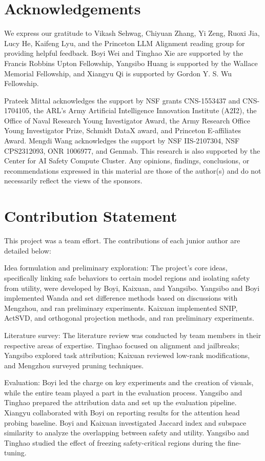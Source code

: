 \documentclass[10pt]{article}
\begin{document}
\section*{Acknowledgements}
We express our gratitude to Vikash Sehwag, Chiyuan Zhang, Yi Zeng, Ruoxi Jia, Lucy He, Kaifeng Lyu, and the Princeton LLM Alignment reading group for providing helpful feedback. Boyi Wei and Tinghao Xie are supported by the Francis Robbins Upton Fellowship, Yangsibo Huang is supported by the Wallace Memorial Fellowship, and Xiangyu Qi is supported by Gordon Y. S. Wu Fellowship.

Prateek Mittal acknowledges the support by NSF grants CNS-1553437 and CNS-1704105, the ARL's Army Artificial Intelligence Innovation Institute (A2I2), the Office of Naval Research Young Investigator Award, the Army Research Office Young Investigator Prize, Schmidt DataX award, and Princeton E-affiliates Award. Mengdi Wang acknowledges the support by NSF IIS-2107304, NSF CPS2312093, ONR 1006977, and Genmab. This research is also supported by the Center for AI Safety Compute Cluster. Any opinions, findings, conclusions, or recommendations expressed in this material are those of the author(s) and do not necessarily reflect the views of the sponsors.

\section*{Contribution Statement}
This project was a team effort. The contributions of each junior author are detailed below:

Idea formulation and preliminary exploration: The project's core ideas, specifically linking safe behaviors to certain model regions and isolating safety from utility, were developed by Boyi, Kaixuan, and Yangsibo. Yangsibo and Boyi implemented Wanda and set difference methods based on discussions with Mengzhou, and ran preliminary experiments. Kaixuan implemented SNIP, ActSVD, and orthogonal projection methods, and ran preliminary experiments.

Literature survey: The literature review was conducted by team members in their respective areas of expertise. Tinghao focused on alignment and jailbreaks; Yangsibo explored task attribution; Kaixuan reviewed low-rank modifications, and Mengzhou surveyed pruning techniques.

Evaluation: Boyi led the charge on key experiments and the creation of visuals, while the entire team played a part in the evaluation process. Yangsibo and Tinghao prepared the attribution data and set up the evaluation pipeline. Xiangyu collaborated with Boyi on reporting results for the attention head probing baseline. Boyi and Kaixuan investigated Jaccard index and subspace similarity to analyze the overlapping between safety and utility. Yangsibo and Tinghao studied the effect of freezing safety-critical regions during the fine-tuning.
\end{document}
